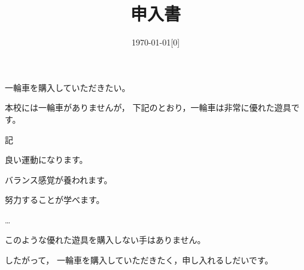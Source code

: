 \documentclass[a4paper,papersize,12pt]{jsarticle}
\begin{document}

\title{申入書}

\date{\today[0]}



\maketitle

\sectionZ{}


一輪車を購入していただきたい。


本校には一輪車がありませんが，
下記のとおり，一輪車は非常に優れた遊具です。

\hfil{記}

\renewcommand{\printsectionB}[1]{\alph{sectionB}）}

\sectionB*{}良い運動になります。

\sectionB*{}バランス感覚が養われます。

\sectionB*{}努力することが学べます。

…

\stateZ
このような優れた遊具を購入しない手はありません。

したがって，
一輪車を購入していただきたく，申し入れるしだいです。

\let\printsectionB\normalprintsectionB
\end{document}
